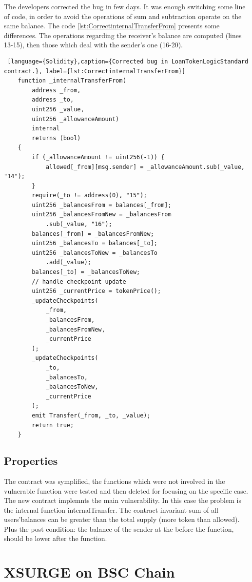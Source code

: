 The developers corrected the bug in few days. 
It was enough switching some line of code, in order to avoid the operations of sum and subtraction operate on the same balance. 
The code \autoref{lst:CorrectinternalTransferFrom} presents some differences. The operations regarding the receiver's balance are computed (lines 13-15), then those which deal with the sender's one (16-20).
\begin{lstlisting} [language={Solidity},caption={Corrected bug in LoanTokenLogicStandard contract.}, label={lst:CorrectinternalTransferFrom}]
    function _internalTransferFrom(
        address _from,
        address _to,
        uint256 _value,
        uint256 _allowanceAmount)
        internal
        returns (bool)
    {
        if (_allowanceAmount != uint256(-1)) {
            allowed[_from][msg.sender] = _allowanceAmount.sub(_value, "14");
        }
        require(_to != address(0), "15");
        uint256 _balancesFrom = balances[_from];
        uint256 _balancesFromNew = _balancesFrom
            .sub(_value, "16");
        balances[_from] = _balancesFromNew;
        uint256 _balancesTo = balances[_to];
        uint256 _balancesToNew = _balancesTo
            .add(_value);
        balances[_to] = _balancesToNew;
        // handle checkpoint update
        uint256 _currentPrice = tokenPrice();
        _updateCheckpoints(
            _from,
            _balancesFrom,
            _balancesFromNew,
            _currentPrice
        );
        _updateCheckpoints(
            _to,
            _balancesTo,
            _balancesToNew,
            _currentPrice
        );
        emit Transfer(_from, _to, _value);
        return true;
    }   
\end{lstlisting}

\subsection{Properties}
The contract was symplified, the functions which were not involved in the vulnerable function were tested and then deleted for 
focusing on the specific case. The new contract implemnts the main vulnerability.
In this case the problem is the internal function internalTransfer. The contract invariant sum of all 
users'balances can be greater than the total supply (more token than allowed). Plus the post condition: 
the balance of the sender at the before the function, should be lower after the function.


\section{XSURGE on BSC Chain}   
\label{sec:Exploits:XSURGE}

